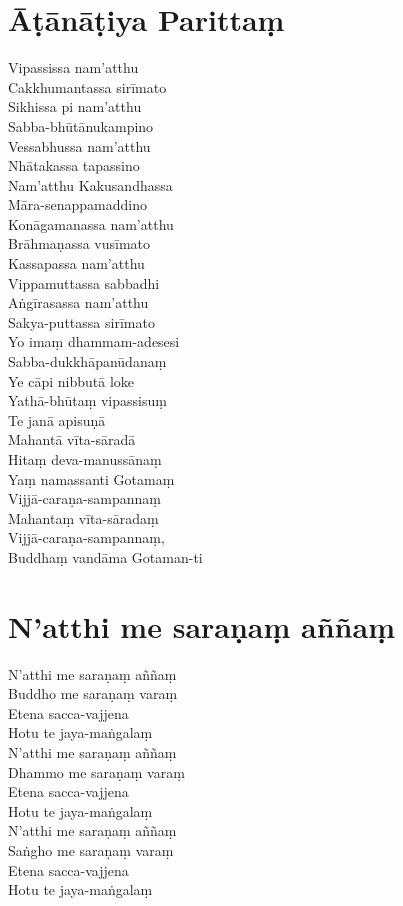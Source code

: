 \clearpage

\chapter{Āṭānāṭiya Parittaṃ}%


\begin{paritta}
Vipassissa nam'atthu\\
Cakkhumantassa sirīmato\\
Sikhissa pi nam'atthu\\
Sabba-bhūtānukampino\\
Vessabhussa nam'atthu\\
Nhātakassa tapassino\\
Nam'atthu Kakusandhassa\\
Māra-senappamaddino\\
Konāgamanassa nam'atthu\\
Brāhmaṇassa vusīmato\\
Kassapassa nam'atthu\\
Vippamuttassa sabbadhi\\
Aṅgīrasassa nam'atthu\\
Sakya-puttassa sirīmato\\
Yo imaṃ dhammam-adesesi\\
Sabba-dukkhāpanūdanaṃ\\
Ye cāpi nibbutā loke\\
Yathā-bhūtaṃ vipassisuṃ\\
Te janā apisuṇā\\
Mahantā vīta-sāradā\\
Hitaṃ deva-manussānaṃ\\
Yaṃ namassanti Gotamaṃ\\
Vijjā-caraṇa-sampannaṃ\\
Mahantaṃ vīta-sāradaṃ\\
Vijjā-caraṇa-sampannaṃ,\\
Buddhaṃ vandāma Gotaman-ti
\end{paritta}

\clearpage

\chapter{N'atthi me saraṇaṃ aññaṃ}%


\begin{paritta}
N'atthi me saraṇaṃ aññaṃ\\
Buddho me saraṇaṃ varaṃ\\
Etena sacca-vajjena\\
Hotu te jaya-maṅgalaṃ\\
N'atthi me saraṇaṃ aññaṃ\\
Dhammo me saraṇaṃ varaṃ\\
Etena sacca-vajjena\\
Hotu te jaya-maṅgalaṃ\\
N'atthi me saraṇaṃ aññaṃ\\
Saṅgho me saraṇaṃ varaṃ\\
Etena sacca-vajjena\\
Hotu te jaya-maṅgalaṃ
\end{paritta}

